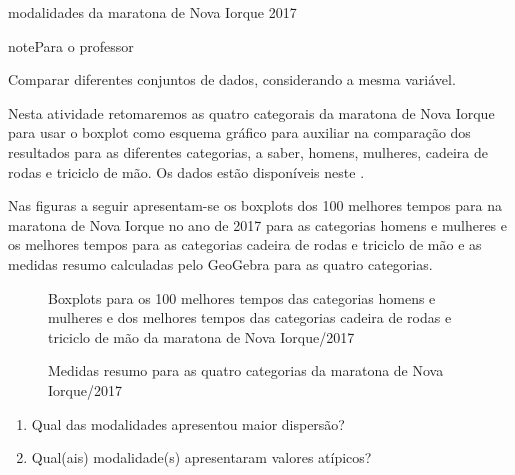 \begin{task}{modalidades da maratona de Nova Iorque 2017}
\label{\detokenize{PE104-7:ativ-comparacaodegruposusandoboxplot}}\label{\detokenize{PE104-7:atividade-modalidades-da-maratona-de-nova-iorque-2017}}
\begin{sphinxadmonition}{note}{Para o professor}

 Comparar diferentes conjuntos de dados, considerando a mesma variável.

 Nesta atividade retomaremos as quatro categorais da maratona de Nova Iorque para usar o boxplot como esquema gráfico para auxiliar na comparação dos resultados para as diferentes categorias, a saber, homens, mulheres, cadeira de rodas e triciclo de mão. Os dados estão disponíveis neste .
\end{sphinxadmonition}

Nas figuras a seguir apresentam-se os boxplots dos 100 melhores tempos para na maratona de Nova Iorque no ano de 2017 para as categorias homens e mulheres e os melhores tempos para as categorias cadeira de rodas e triciclo de mão e as medidas resumo calculadas pelo GeoGebra para as quatro categorias.

\begin{figure}[H]
\centering
\capstart

\noindent{}
\caption{Boxplots para os 100 melhores tempos das categorias homens e mulheres e dos melhores tempos das categorias cadeira de rodas e triciclo de mão da maratona de Nova Iorque/2017}\label{\detokenize{PE104-7:fig-boxplotsmaratona}}\label{\detokenize{PE104-7:id1}}\end{figure}

\begin{figure}[H]
\centering
\capstart

\noindent{}
\caption{Medidas resumo para as quatro categorias da maratona de Nova Iorque/2017}\label{\detokenize{PE104-7:fig-medidasresumo4categorias}}\label{\detokenize{PE104-7:id2}}\end{figure}
\begin{enumerate}
\item {} 
Qual das modalidades apresentou maior dispersão?

\item {} 
Qual(ais) modalidade(s) apresentaram valores atípicos?


\end{enumerate}
\end{task}
